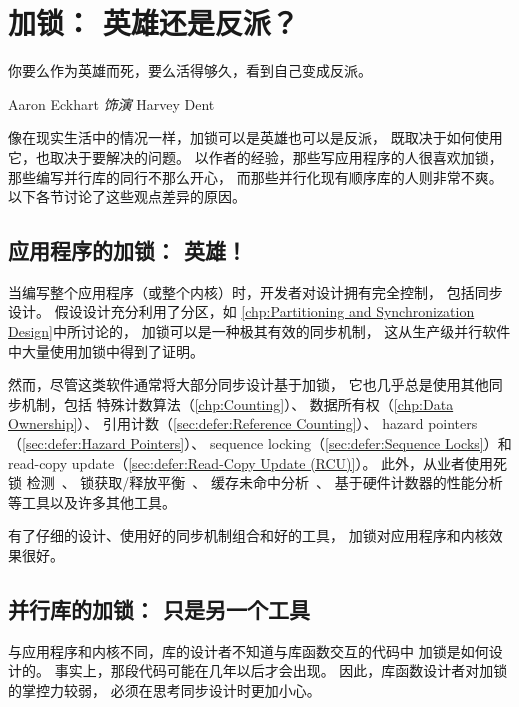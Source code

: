 \section{加锁：
		  英雄还是反派？}
\label{sec:locking:Locking: Hero or Villain?}
%
\epigraph{你要么作为英雄而死，要么活得够久，看到自己变成反派。}
	 {Aaron Eckhart \emph{饰演} Harvey Dent}

像在现实生活中的情况一样，加锁可以是英雄也可以是反派，
既取决于如何使用它，也取决于要解决的问题。
以作者的经验，那些写应用程序的人很喜欢加锁，
那些编写并行库的同行不那么开心，
而那些并行化现有顺序库的人则非常不爽。
以下各节讨论了这些观点差异的原因。

\subsection{应用程序的加锁：
				      英雄！}
\label{sec:locking:Locking For Applications: Hero!}

当编写整个应用程序（或整个内核）时，开发者对设计拥有完全控制，
包括同步设计。
假设设计充分利用了分区，如
\cref{chp:Partitioning and Synchronization Design}中所讨论的，
加锁可以是一种极其有效的同步机制，
这从生产级并行软件中大量使用加锁中得到了证明。

然而，尽管这类软件通常将大部分同步设计基于加锁，
它也几乎总是使用其他同步机制，包括
特殊计数算法（\cref{chp:Counting}）、
数据所有权（\cref{chp:Data Ownership}）、
引用计数（\cref{sec:defer:Reference Counting}）、
hazard pointers（\cref{sec:defer:Hazard Pointers}）、
sequence locking（\cref{sec:defer:Sequence Locks}）和
read-copy update（\cref{sec:defer:Read-Copy Update (RCU)}）。
此外，从业者使用死锁
检测~\cite{JonathanCorbet2006lockdep}、
锁获取/释放平衡~\cite{JonathanCorbet2004sparse}、
缓存未命中分析~\cite{ValgrindHomePage}、
基于硬件计数器的性能分析~\cite{LinuxKernelPerfWiki,OProfileHomePage}
等工具以及许多其他工具。

有了仔细的设计、使用好的同步机制组合和好的工具，
加锁对应用程序和内核效果很好。

\subsection{并行库的加锁：
					    只是另一个工具}
\label{sec:locking:Locking For Parallel Libraries: Just Another Tool}

与应用程序和内核不同，库的设计者不知道与库函数交互的代码中
加锁是如何设计的。
事实上，那段代码可能在几年以后才会出现。
因此，库函数设计者对加锁的掌控力较弱，
必须在思考同步设计时更加小心。

